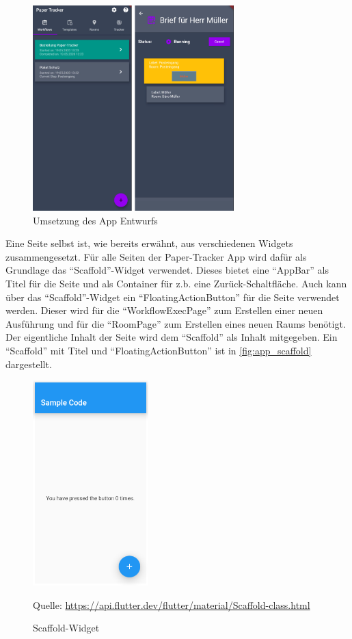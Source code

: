 \begin{figure}[htbp]
	\includegraphics[height=300px]{images/app.png}
	\centering
	\caption{Umsetzung des App Entwurfs}
	\label{fig:app_pages}
\end{figure}

Eine Seite selbst ist, wie bereits erwähnt, aus verschiedenen Widgets zusammengesetzt.
Für alle Seiten der Paper-Tracker App wird dafür als Grundlage das \enquote{Scaffold}-Widget verwendet.
Dieses bietet eine \enquote{AppBar} als Titel für die Seite und als Container für z.b. eine Zurück-Schaltfläche.
Auch kann über das \enquote{Scaffold}-Widget ein \enquote{FloatingActionButton} für die Seite verwendet werden.
Dieser wird für die \enquote{WorkflowExecPage} zum Erstellen einer neuen Ausführung und für die \enquote{RoomPage}
zum Erstellen eines neuen Raums benötigt.
Der eigentliche Inhalt der Seite wird dem \enquote{Scaffold} als Inhalt mitgegeben.
Ein \enquote{Scaffold} mit Titel und \enquote{FloatingActionButton} ist in \autoref{fig:app_scaffold} dargestellt.

\begin{figure}[htbp]
	\includegraphics[height=300px]{images/scaffold.png}
	\centering
	\caption{Scaffold-Widget}
	\small Quelle: \url{https://api.flutter.dev/flutter/material/Scaffold-class.html}
	\label{fig:app_scaffold}
\end{figure}

